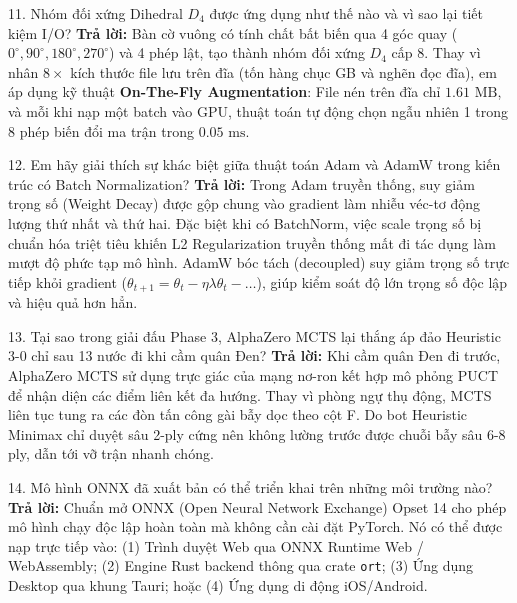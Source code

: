 \documentclass[12pt,a4paper,oneside]{report}
\begin{document}
\begin{defensebox}{11. Nhóm đối xứng Dihedral $D_4$ được ứng dụng như thế nào và vì sao lại tiết kiệm I/O?}
\textbf{Trả lời:} Bàn cờ vuông có tính chất bất biến qua 4 góc quay ($0^\circ, 90^\circ, 180^\circ, 270^\circ$) và 4 phép lật, tạo thành nhóm đối xứng $D_4$ cấp 8. Thay vì nhân $8\times$ kích thước file lưu trên đĩa (tốn hàng chục GB và nghẽn đọc đĩa), em áp dụng kỹ thuật \textbf{On-The-Fly Augmentation}: File nén trên đĩa chỉ $1.61\text{ MB}$, và mỗi khi nạp một batch vào GPU, thuật toán tự động chọn ngẫu nhiên 1 trong 8 phép biến đổi ma trận trong $0.05\text{ ms}$.
\end{defensebox}

\begin{defensebox}{12. Em hãy giải thích sự khác biệt giữa thuật toán Adam và AdamW trong kiến trúc có Batch Normalization?}
\textbf{Trả lời:} Trong Adam truyền thống, suy giảm trọng số (Weight Decay) được gộp chung vào gradient làm nhiễu véc-tơ động lượng thứ nhất và thứ hai. Đặc biệt khi có BatchNorm, việc scale trọng số bị chuẩn hóa triệt tiêu khiến L2 Regularization truyền thống mất đi tác dụng làm mượt độ phức tạp mô hình. AdamW bóc tách (decoupled) suy giảm trọng số trực tiếp khỏi gradient ($\theta_{t+1} = \theta_t - \eta \lambda \theta_t - \dots$), giúp kiểm soát độ lớn trọng số độc lập và hiệu quả hơn hẳn.
\end{defensebox}

\begin{defensebox}{13. Tại sao trong giải đấu Phase 3, AlphaZero MCTS lại thắng áp đảo Heuristic 3-0 chỉ sau 13 nước đi khi cầm quân Đen?}
\textbf{Trả lời:} Khi cầm quân Đen đi trước, AlphaZero MCTS sử dụng trực giác của mạng nơ-ron kết hợp mô phỏng PUCT để nhận diện các điểm liên kết đa hướng. Thay vì phòng ngự thụ động, MCTS liên tục tung ra các đòn tấn công gài bẫy dọc theo cột F. Do bot Heuristic Minimax chỉ duyệt sâu 2-ply cứng nên không lường trước được chuỗi bẫy sâu 6-8 ply, dẫn tới vỡ trận nhanh chóng.
\end{defensebox}

\begin{defensebox}{14. Mô hình ONNX đã xuất bản có thể triển khai trên những môi trường nào?}
\textbf{Trả lời:} Chuẩn mở ONNX (Open Neural Network Exchange) Opset 14 cho phép mô hình chạy độc lập hoàn toàn mà không cần cài đặt PyTorch. Nó có thể được nạp trực tiếp vào: (1) Trình duyệt Web qua ONNX Runtime Web / WebAssembly; (2) Engine Rust backend thông qua crate \texttt{ort}; (3) Ứng dụng Desktop qua khung Tauri; hoặc (4) Ứng dụng di động iOS/Android.
\end{defensebox}
\end{document}
